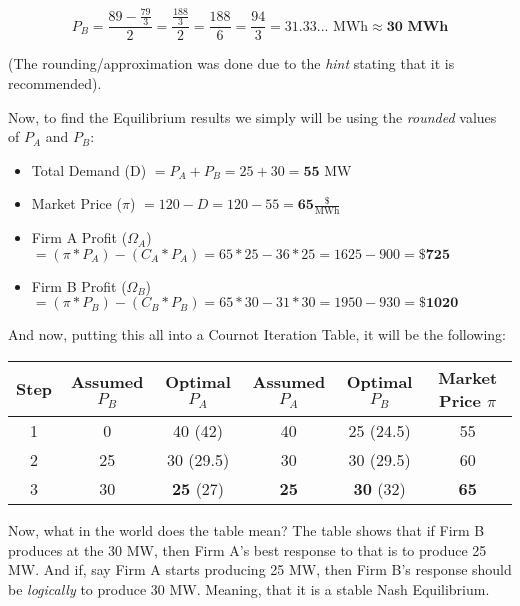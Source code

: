 \documentclass{article}
\begin{document}
$$ P_B = \frac{89 - \frac{79}{3}}{2} = \frac{\frac{188}{3}}{2} = \frac{188}{6} = \frac{94}{3} = 31.33\text{... MWh} \approx \textbf{30 MWh} $$
\begin{center}
  (The rounding/approximation was done due to the \textit{hint} stating that it is recommended).
\end{center}
\pagebreak
Now, to find the Equilibrium results we simply will be using the \textit{rounded} values of $P_A$ and $P_B$:
\begin{itemize}
\item Total Demand (D) $= P_A + P_B = 25+30 = \textbf{55}\text{ MW}$
  \item Market Price ($\pi$) $= 120 - D= 120 - 55 = \textbf{65}\frac{\$}{\text{MWh}}$
  \item Firm A Profit ($\Omega_A$) $= (\pi*P_A) - (C_A*P_A) = 65*25-36*25=1625-900=\$\textbf{725}$
  \item Firm B Profit ($\Omega_B$) $= (\pi*P_B) - (C_B*P_B) = 65*30-31*30=1950-930=\$\textbf{1020}$
\end{itemize}
And now, putting this all into a Cournot Iteration Table, it will be the following:
\begin{center}
  \begin{tabular}{|cccccc|}
    \hline
    \textbf{Step} & \textbf{Assumed $P_B$} & \textbf{Optimal $P_A$} & \textbf{Assumed $P_A$} & \textbf{Optimal $P_B$} & \textbf{Market Price $\pi$} \\
    \hline
    1 & 0 & 40 (42) & 40 & 25 (24.5) & 55 \\
    2 & 25 & 30 (29.5) & 30 & 30 (29.5) & 60 \\
    3 & 30 & \textbf{25} (27) & \textbf{25} & \textbf{30} (32) & \textbf{65} \\
    \hline
  \end{tabular}
\end{center}
Now, what in the world does the table mean? The table shows that if Firm B produces at the 30 MW, then Firm A's best response to that is to produce 25 MW. And if, say Firm A starts producing 25 MW, then Firm B's response should be \textit{logically} to produce 30 MW. Meaning, that it is a stable Nash Equilibrium.
\end{document}
